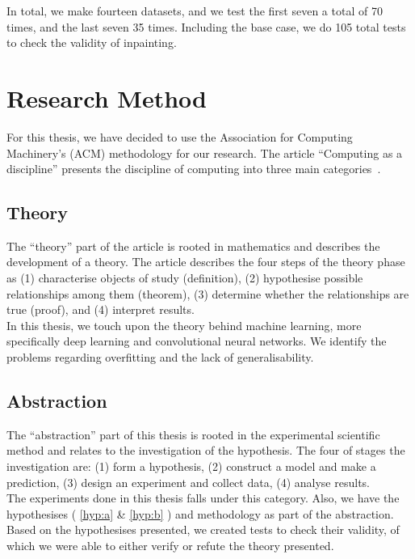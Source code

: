 In total, we make fourteen datasets, and we test the first seven a total of 70 times, and the last seven 35 times. Including the base case, we do 105 total tests to check the validity of inpainting.


\section{Research Method}
For this thesis, we have decided to use the Association for Computing Machinery's (ACM) methodology for our research. The article ``Computing as a discipline'' presents the discipline of computing into three main categories~\cite{Denning:1989:CD:63238.63239}. 
\subsection{Theory}
The ``theory'' part of the article is rooted in mathematics and describes the development of a theory. The article describes the four steps of the theory phase as (1) characterise objects of study (definition), (2) hypothesise
possible relationships among them (theorem), (3) determine whether the
relationships are true (proof), and (4) interpret results.\\

In this thesis, we touch upon the theory behind machine learning, more specifically deep learning and convolutional neural networks. We identify the problems regarding overfitting and the lack of generalisability.



\subsection{Abstraction}
The ``abstraction'' part of this thesis is rooted in the experimental scientific method and relates to the investigation of the hypothesis. The four of stages the investigation are: (1) form a hypothesis, (2) construct a model and make a prediction, (3) design an experiment and collect data, (4) analyse results. \\

The experiments done in this thesis falls under this category. Also, we have the hypothesises ( \ref{hyp:a} \& \ref{hyp:b} ) and methodology as part of the abstraction. Based on the hypothesises presented, we created tests to check their validity, of which we were able to either verify or refute the theory presented.



